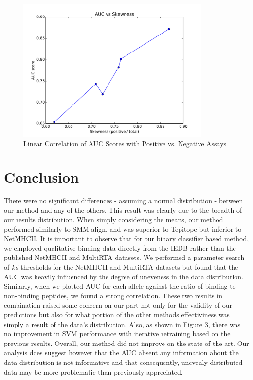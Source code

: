 \documentclass[journal]{IEEEtran}
\begin{document}
\begin{figure}[!h]
\centering
\includegraphics[width=3.8in]{skew_v_auc}
\caption{Linear Correlation of AUC Scores with Positive vs. Negative Assays}
\label{fig_sim}
\end{figure}



\section{Conclusion}
There were no significant differences - assuming a normal distribution - between our method and any of the others.  This result was clearly due to the breadth of our results distribution.  When simply considering the means, our method  performed similarly to SMM-align, and was superior to Tepitope but inferior to NetMHCII.  It is important to observe that for our binary classifier based method, we employed qualitative binding data directly from the IEDB rather than the published NetMHCII and MultiRTA datasets.  We performed a parameter search of \textit{kd} thresholds for the NetMHCII and MultiRTA datasets but found that the AUC was heavily influenced by the degree of uneveness in the data distribution.  Similarly, when we plotted AUC for each allele against the ratio of binding to non-binding peptides, we found a strong correlation.  These two results in combination raised some concern on our part not only for the validity of our predictions but also for what portion of the other methods effectiviness was simply a result of the data's distribution. Also, as shown in Figure 3, there was no improvement in SVM performance with iterative retraining based on the previous results.  Overall, our method did not improve on the state of the art.  Our analysis does suggest however that the AUC absent any information about the data distribution is not informative and that consequently, unevenly distributed data may be more problematic than previously appreciated.
\end{document}
